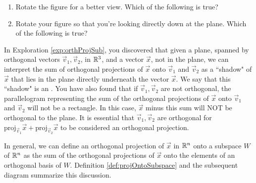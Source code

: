 \documentclass{ximera}
\begin{document}
\begin{exploration}
\begin{enumerate}
 \item 
 Rotate the figure for a better view.  Which of the following is true?
 \begin{multipleChoice}
 \end{multipleChoice}
 \item
 Rotate your figure so that you're looking directly down at the plane. Which of the following is true?
 \begin{multipleChoice}
 \end{multipleChoice}
\end{enumerate}
\end{exploration}

In Exploration \ref{exp:orthProjSub}, you discovered that given a plane, spanned by orthogonal vectors $\vec{v}_1,\vec{v}_2$, in $\mathbb{R}^3$, and a vector $\vec{x}$, not in the plane, we can interpret the sum of orthogonal projections of $\vec{x}$ onto $\vec{v}_1$ and $\vec{v}_2$ as a ``shadow" of $\vec{x}$ that lies in the plane directly underneath the vector $\vec{x}$. We say that this ``shadow" is an . You have also found that if $\vec{v}_1,\vec{v}_2$ are not orthogonal, the parallelogram representing the sum of the orthogonal projections of $\vec{x}$ onto $\vec{v}_1$ and $\vec{v}_2$ will not be a rectangle.  In this case, $\vec{x}$ minus this sum will NOT be orthogonal to the plane.  It is essential that $\vec{v}_1,\vec{v}_2$ are orthogonal for $\mbox{proj}_{\vec{v}_1}\vec{x}+\mbox{proj}_{\vec{v}_2}\vec{x}$ to be considered an orthogonal projection.  

In general, we can define an orthogonal projection of $\vec{x}$ in $\mathbb{R}^n$ onto a subspace $W$ of $\mathbb{R}^n$ as the sum of the orthogonal projections of $\vec{x}$ onto the elements of an orthogonal basis of $W$.  %
Definition \ref{def:projOntoSubspace} and the subsequent diagram summarize this discussion.
\end{document}
